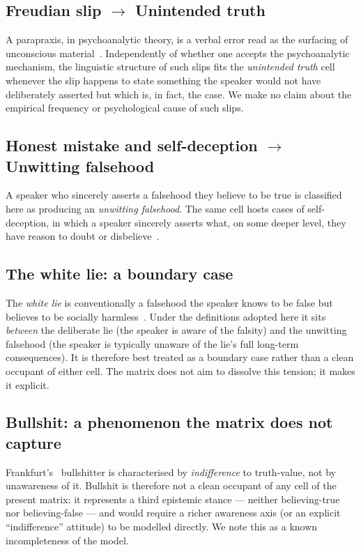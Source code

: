 \documentclass[11pt,a4paper]{article}
\begin{document}
\subsection{Freudian slip $\to$ Unintended truth}
A parapraxis, in psychoanalytic theory, is a verbal error read as the
surfacing of unconscious material~\cite{freud1901}. Independently of
whether one accepts the psychoanalytic mechanism, the linguistic
structure of such slips fits the \emph{unintended truth} cell whenever
the slip happens to state something the speaker would not have
deliberately asserted but which is, in fact, the case. We make no claim
about the empirical frequency or psychological cause of such slips.

\subsection{Honest mistake and self-deception $\to$ Unwitting falsehood}
A speaker who sincerely asserts a falsehood they believe to be true is
classified here as producing an \emph{unwitting falsehood}. The same
cell hosts cases of self-deception, in which a speaker sincerely
asserts what, on some deeper level, they have reason to doubt or
disbelieve~\cite{mele2001}.

\subsection{The white lie: a boundary case}
The \emph{white lie} is conventionally a falsehood the speaker knows to
be false but believes to be socially harmless~\cite{bok1978}. Under the
definitions adopted here it sits \emph{between} the deliberate lie (the
speaker is aware of the falsity) and the unwitting falsehood (the
speaker is typically unaware of the lie's full long-term consequences).
It is therefore best treated as a boundary case rather than a clean
occupant of either cell. The matrix does not aim to dissolve this
tension; it makes it explicit.

\subsection{Bullshit: a phenomenon the matrix does not capture}
Frankfurt's~\cite{frankfurt2005} bullshitter is characterised by
\emph{indifference} to truth-value, not by unawareness of it. Bullshit
is therefore not a clean occupant of any cell of the present matrix: it
represents a third epistemic stance --- neither believing-true nor
believing-false --- and would require a richer awareness axis (or an
explicit ``indifference'' attitude) to be modelled directly. We note
this as a known incompleteness of the model.
\end{document}
